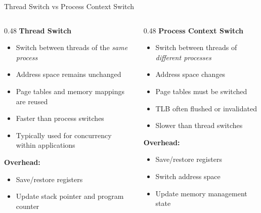 \begin{frame}{Thread Switch vs Process Context Switch}
  \begin{columns}[t]

    \begin{column}{0.48\textwidth}
      \textbf{Thread Switch}

      \begin{itemize}
        \item Switch between threads of the \textit{same process}
        \item Address space remains unchanged
        \item Page tables and memory mappings are reused
        \item Faster than process switches
        \item Typically used for concurrency within applications
      \end{itemize}

      \vspace{0.5em}
      \textbf{Overhead:}
      \begin{itemize}
        \item Save/restore registers
        \item Update stack pointer and program counter
      \end{itemize}
    \end{column}

    \begin{column}{0.48\textwidth}
      \textbf{Process Context Switch}

      \begin{itemize}
        \item Switch between threads of \textit{different processes}
        \item Address space changes
        \item Page tables must be switched
        \item TLB often flushed or invalidated
        \item Slower than thread switches
      \end{itemize}

      \vspace{0.5em}
      \textbf{Overhead:}
      \begin{itemize}
        \item Save/restore registers
        \item Switch address space
        \item Update memory management state
      \end{itemize}
    \end{column}

  \end{columns}
\end{frame}

